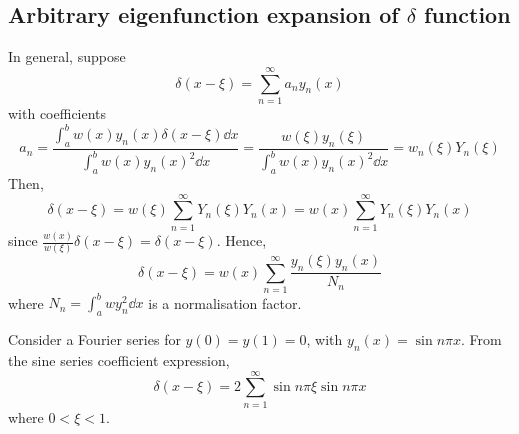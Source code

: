 \subsection{Arbitrary eigenfunction expansion of \texorpdfstring{\( \delta \)}{𝛿} function}
In general, suppose
\[
	\delta(x-\xi) = \sum_{n=1}^\infty a_n y_n(x)
\]
with coefficients
\[
	a_n = \frac{\int_a^b w(x) y_n(x) \delta(x-\xi) \dd{x}}{\int_a^b w(x) y_n(x)^2 \dd{x}} = \frac{w(\xi) y_n(\xi)}{\int_a^b w(x) y_n(x)^2 \dd{x}} = w_n(\xi) Y_n(\xi)
\]
Then,
\[
	\delta(x-\xi) = w(\xi) \sum_{n=1}^\infty Y_n(\xi) Y_n(x) = w(x) \sum_{n=1}^\infty Y_n(\xi) Y_n(x)
\]
since \( \frac{w(x)}{w(\xi)} \delta(x - \xi) = \delta(x - \xi) \).
Hence,
\[
	\delta(x-\xi) = w(x) \sum_{n=1}^\infty \frac{y_n(\xi) y_n(x)}{N_n}
\]
where \( N_n = \int_a^b w y_n^2 \dd{x} \) is a normalisation factor.
\begin{example}
	Consider a Fourier series for \( y(0) = y(1) = 0 \), with \( y_n(x) = \sin n \pi x \).
	From the sine series coefficient expression,
	\[
		\delta(x-\xi) = 2\sum_{n=1}^\infty \sin n \pi \xi \sin n \pi x
	\]
	where \( 0 < \xi < 1 \).
\end{example}

